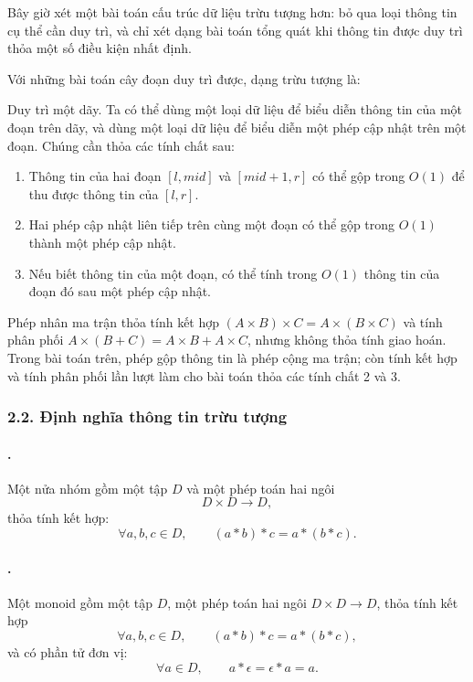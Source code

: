 \documentclass[11pt]{article}
\begin{document}
Bây giờ xét một bài toán cấu trúc dữ liệu trừu tượng hơn: bỏ qua loại thông tin
cụ thể cần duy trì, và chỉ xét dạng bài toán tổng quát khi thông tin được duy
trì thỏa một số điều kiện nhất định.

Với những bài toán cây đoạn duy trì được, dạng trừu tượng là:

Duy trì một dãy. Ta có thể dùng một loại dữ liệu để biểu diễn thông tin của một
đoạn trên dãy, và dùng một loại dữ liệu để biểu diễn một phép cập nhật trên một
đoạn. Chúng cần thỏa các tính chất sau:
\begin{enumerate}
  \item Thông tin của hai đoạn \([l,\mathit{mid}]\) và
  \([\mathit{mid}+1,r]\) có thể gộp trong \(O(1)\) để thu được thông tin của
  \([l,r]\).
  \item Hai phép cập nhật liên tiếp trên cùng một đoạn có thể gộp trong
  \(O(1)\) thành một phép cập nhật.
  \item Nếu biết thông tin của một đoạn, có thể tính trong \(O(1)\) thông tin
  của đoạn đó sau một phép cập nhật.
\end{enumerate}

Phép nhân ma trận thỏa tính kết hợp
\((A\times B)\times C=A\times(B\times C)\) và tính phân phối
\(A\times(B+C)=A\times B+A\times C\), nhưng không thỏa tính giao hoán. Trong
bài toán trên, phép gộp thông tin là phép cộng ma trận; còn tính kết hợp và
tính phân phối lần lượt làm cho bài toán thỏa các tính chất 2 và 3.

\subsubsection*{2.2. Định nghĩa thông tin trừu tượng}

\paragraph{.}
Một nửa nhóm gồm một tập \(D\) và một phép toán hai ngôi
\[
  D\times D\to D,
\]
thỏa tính kết hợp:
\[
  \forall a,b,c\in D,\qquad (a*b)*c=a*(b*c).
\]

\paragraph{.}
Một monoid gồm một tập \(D\), một phép toán hai ngôi \(D\times D\to D\), thỏa
tính kết hợp
\[
  \forall a,b,c\in D,\qquad (a*b)*c=a*(b*c),
\]
và có phần tử đơn vị:
\[
  \forall a\in D,\qquad a*\epsilon=\epsilon*a=a.
\]
\end{document}
